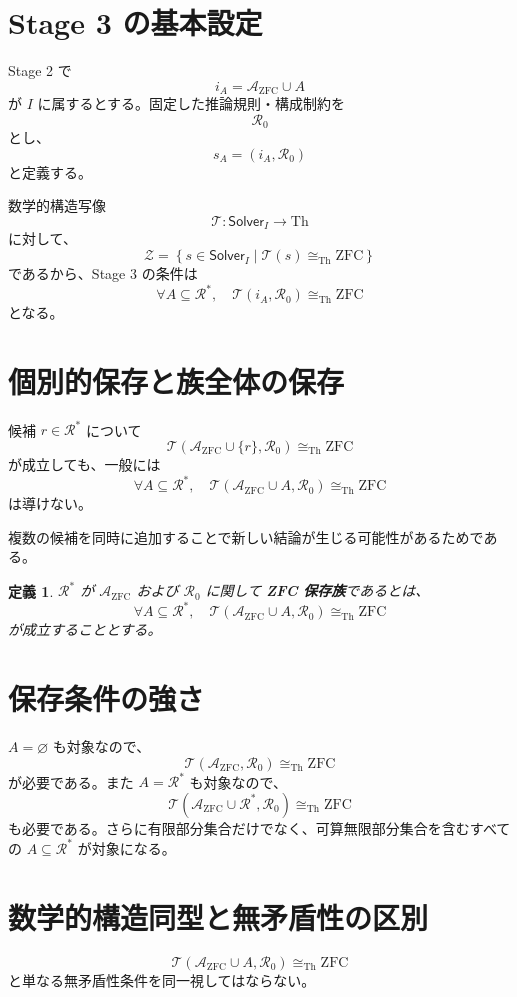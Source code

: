 \documentclass[a4paper,11pt]{article}
\newtheorem{definition}[section]{定義}
\newcommand{\Solver}{\mathsf{Solver}}
\begin{document}
\section{Stage 3 の基本設定}
Stage 2 で
\[
i_A=\mathcal{A}_{\mathrm{ZFC}}\cup A
\]
が \(I\) に属するとする。固定した推論規則・構成制約を
\[
\mathcal{R}_0
\]
とし、
\[
s_A=(i_A,\mathcal{R}_0)
\]
と定義する。

数学的構造写像
\[
\mathcal{T}:\Solver_I\to\mathrm{Th}
\]
に対して、
\[
\mathcal{Z}=
\left\{
s\in\Solver_I\mid
\mathcal{T}(s)\cong_{\mathrm{Th}}\mathrm{ZFC}
\right\}
\]
であるから、Stage 3 の条件は
\[
\boxed{
\forall A\subseteq\mathcal{R}^*,
\quad
\mathcal{T}(i_A,\mathcal{R}_0)
\cong_{\mathrm{Th}}\mathrm{ZFC}
}
\]
となる。

\section{個別的保存と族全体の保存}
候補 \(r\in\mathcal{R}^*\) について
\[
\mathcal{T}(\mathcal{A}_{\mathrm{ZFC}}\cup\{r\},\mathcal{R}_0)
\cong_{\mathrm{Th}}\mathrm{ZFC}
\]
が成立しても、一般には
\[
\forall A\subseteq\mathcal{R}^*,
\quad
\mathcal{T}(\mathcal{A}_{\mathrm{ZFC}}\cup A,\mathcal{R}_0)
\cong_{\mathrm{Th}}\mathrm{ZFC}
\]
は導けない。

複数の候補を同時に追加することで新しい結論が生じる可能性があるためである。

\begin{definition}
\(\mathcal{R}^*\) が \(\mathcal{A}_{\mathrm{ZFC}}\) および \(\mathcal{R}_0\) に関して \textbf{ZFC 保存族}であるとは、
\[
\boxed{
\forall A\subseteq\mathcal{R}^*,
\quad
\mathcal{T}(\mathcal{A}_{\mathrm{ZFC}}\cup A,\mathcal{R}_0)
\cong_{\mathrm{Th}}\mathrm{ZFC}
}
\]
が成立することとする。
\end{definition}

\section{保存条件の強さ}
\(A=\varnothing\) も対象なので、
\[
\mathcal{T}(\mathcal{A}_{\mathrm{ZFC}},\mathcal{R}_0)
\cong_{\mathrm{Th}}\mathrm{ZFC}
\]
が必要である。また \(A=\mathcal{R}^*\) も対象なので、
\[
\mathcal{T}(\mathcal{A}_{\mathrm{ZFC}}\cup\mathcal{R}^*,\mathcal{R}_0)
\cong_{\mathrm{Th}}\mathrm{ZFC}
\]
も必要である。さらに有限部分集合だけでなく、可算無限部分集合を含むすべての \(A\subseteq\mathcal{R}^*\) が対象になる。

\section{数学的構造同型と無矛盾性の区別}
\[
\mathcal{T}(\mathcal{A}_{\mathrm{ZFC}}\cup A,\mathcal{R}_0)
\cong_{\mathrm{Th}}\mathrm{ZFC}
\]
と単なる無矛盾性条件を同一視してはならない。
\end{document}
